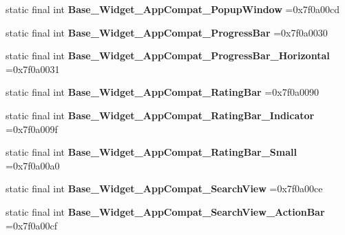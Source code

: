\begin{DoxyCompactItemize}
static final int {\bfseries Base\+\_\+\+Widget\+\_\+\+App\+Compat\+\_\+\+Popup\+Window} =0x7f0a00cd
\item 
\mbox{\label{classproject4_1_1xaria_1_1R_1_1style_aa88a24617ad1401be64d25d0084898c2}} 
static final int {\bfseries Base\+\_\+\+Widget\+\_\+\+App\+Compat\+\_\+\+Progress\+Bar} =0x7f0a0030
\item 
\mbox{\label{classproject4_1_1xaria_1_1R_1_1style_a7096a6ee7cd68acfe88d9216dfc3fd3c}} 
static final int {\bfseries Base\+\_\+\+Widget\+\_\+\+App\+Compat\+\_\+\+Progress\+Bar\+\_\+\+Horizontal} =0x7f0a0031
\item 
\mbox{\label{classproject4_1_1xaria_1_1R_1_1style_a3ef682d2878f615aab1a3e4dfc3157d4}} 
static final int {\bfseries Base\+\_\+\+Widget\+\_\+\+App\+Compat\+\_\+\+Rating\+Bar} =0x7f0a0090
\item 
\mbox{\label{classproject4_1_1xaria_1_1R_1_1style_a52cfde6c451e85a3650958ace123b45b}} 
static final int {\bfseries Base\+\_\+\+Widget\+\_\+\+App\+Compat\+\_\+\+Rating\+Bar\+\_\+\+Indicator} =0x7f0a009f
\item 
\mbox{\label{classproject4_1_1xaria_1_1R_1_1style_a28292704b646032c51fd358a7607e8ab}} 
static final int {\bfseries Base\+\_\+\+Widget\+\_\+\+App\+Compat\+\_\+\+Rating\+Bar\+\_\+\+Small} =0x7f0a00a0
\item 
\mbox{\label{classproject4_1_1xaria_1_1R_1_1style_a3072598f651b3aefee6848077d100fb7}} 
static final int {\bfseries Base\+\_\+\+Widget\+\_\+\+App\+Compat\+\_\+\+Search\+View} =0x7f0a00ce
\item 
\mbox{\label{classproject4_1_1xaria_1_1R_1_1style_a909bc5ff4546452c8eacfae11c32136d}} 
static final int {\bfseries Base\+\_\+\+Widget\+\_\+\+App\+Compat\+\_\+\+Search\+View\+\_\+\+Action\+Bar} =0x7f0a00cf
\item 
\mbox{\label{classproject4_1_1xaria_1_1R_1_1style_a7f135acccb543fdd5f25ccb5984340a4}} 

\end{DoxyCompactItemize}
